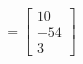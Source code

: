 \documentclass[preview]{standalone}
\begin{document}
\begin{align*}
=\begin{bmatrix} 10 \\ -54 \\ 3 \end{bmatrix}
\end{align*}
\end{document}
